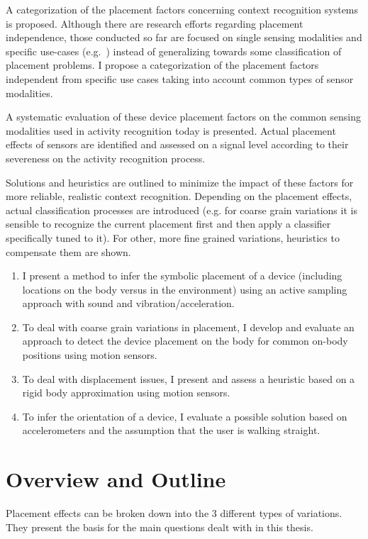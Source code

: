 \begin{description}
 \item{A categorization of the placement factors} concerning context recognition
 systems is proposed. Although there are research efforts regarding placement independence,
 those conducted so far are focused on single sensing modalities and specific use-cases (e.g.~\cite{deadreckoning})
 instead of generalizing towards some classification of placement problems. I propose a categorization
 of the placement factors independent from specific use cases taking into account common
 types of sensor modalities.
 \item{A systematic evaluation} of these device placement factors on the common
sensing modalities used in activity recognition today is presented. Actual placement effects of sensors are
	identified and assessed on a signal level according to their severeness on the activity recognition process. 
 \item{Solutions and heuristics} are outlined to minimize the impact of these
factors for more reliable, realistic context recognition. Depending on the placement effects, actual
classification processes are introduced (e.g. for coarse grain variations it is sensible to recognize
the current placement first and then apply a classifier specifically tuned to it). For other, more
fine grained variations, heuristics to compensate them are shown. 
\begin{enumerate}
\item I present a method to infer the symbolic placement of a device (including locations on the body versus in the 
environment) using an active sampling approach with sound and vibration/acceleration. 
\item To deal with coarse grain variations in placement, I develop and evaluate an approach to detect the
device placement on the body for common on-body positions using motion sensors.
\item To deal with displacement issues, I present and assess a heuristic based on a rigid body approximation using
motion sensors.
\item To infer the orientation of a device, I evaluate a possible solution based on accelerometers and the assumption
that the user is walking straight.
\end{enumerate}
\end{description}


\section{Overview and Outline}
\label{mot:overview}
Placement effects can be broken down into the 
3 different types of variations. They present the basis for the 
main questions dealt with in this thesis.

